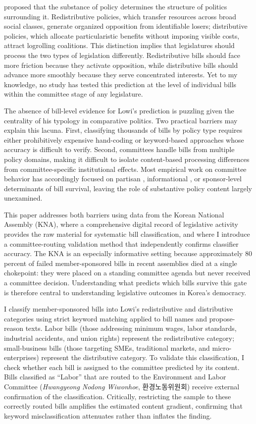 \documentclass[11pt]{article}
\begin{document}
\citet{lowi1964} proposed that the substance of policy determines the structure of politics surrounding it. Redistributive policies, which transfer resources across broad social classes, generate organized opposition from identifiable losers; distributive policies, which allocate particularistic benefits without imposing visible costs, attract logrolling coalitions. This distinction implies that legislatures should process the two types of legislation differently. Redistributive bills should face more friction because they activate opposition, while distributive bills should advance more smoothly because they serve concentrated interests. Yet to my knowledge, no study has tested this prediction at the level of individual bills within the committee stage of any legislature.

The absence of bill-level evidence for Lowi's prediction is puzzling given the centrality of his typology in comparative politics. Two practical barriers may explain this lacuna. First, classifying thousands of bills by policy type requires either prohibitively expensive hand-coding or keyword-based approaches whose accuracy is difficult to verify. Second, committees handle bills from multiple policy domains, making it difficult to isolate content-based processing differences from committee-specific institutional effects. Most empirical work on committee behavior has accordingly focused on partisan \citep{cox2005}, informational \citep{krehbiel1991}, or sponsor-level \citep{volden2014} determinants of bill survival, leaving the role of substantive policy content largely unexamined.

This paper addresses both barriers using data from the Korean National Assembly (KNA), where a comprehensive digital record of legislative activity provides the raw material for systematic bill classification, and where I introduce a committee-routing validation method that independently confirms classifier accuracy. The KNA is an especially informative setting because approximately 80 percent of failed member-sponsored bills in recent assemblies died at a single chokepoint: they were placed on a standing committee agenda but never received a committee decision. Understanding what predicts which bills survive this gate is therefore central to understanding legislative outcomes in Korea's democracy.

I classify member-sponsored bills into Lowi's redistributive and distributive categories using strict keyword matching applied to bill names and propose-reason texts. Labor bills (those addressing minimum wages, labor standards, industrial accidents, and union rights) represent the redistributive category; small-business bills (those targeting SMEs, traditional markets, and micro-enterprises) represent the distributive category. To validate this classification, I check whether each bill is assigned to the committee predicted by its content. Bills classified as ``Labor'' that are routed to the Environment and Labor Committee (\textit{Hwangyeong Nodong Wiwonhoe}, 환경노동위원회) receive external confirmation of the classification. Critically, restricting the sample to these correctly routed bills amplifies the estimated content gradient, confirming that keyword misclassification attenuates rather than inflates the finding.
\end{document}
